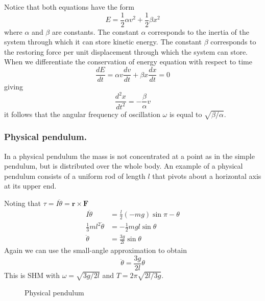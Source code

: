 \documentclass[../../../main.tex]{subfiles}
\begin{document}
Notice that both equations have the form
\begin{equation*}
    E=\frac{1}{2}\alpha v^2+\frac{1}{2}\beta x^2
\end{equation*}
where $\alpha$ and $\beta$ are constants. The constant $\alpha$ corresponds to the inertia of the system through which it can store kinetic energy. The constant $\beta$ corresponds to the restoring force per unit displacement through which the system can store. When we differentiate the conservation of energy equation with respect to time 
\begin{equation*}
    \frac{dE}{dt}=\alpha v\frac{dv}{dt}+\beta x\frac{dx}{dt}=0
\end{equation*}
giving
\begin{equation*}
    \frac{d^2x}{dt^2}=-\frac{\beta}{\alpha}v
\end{equation*}
it follows that the angular frequency of oscillation $\omega$ is equal to $\sqrt{\beta/\alpha}$.

\subsubsection{Physical pendulum.} In a physical pendulum the mass is not concentrated at a point as in the simple pendulum, but is distributed over the whole body. An example of a physical pendulum consists of a uniform rod of length $l$ that pivots about a horizontal axis at its upper end. 

Noting that $\tau=I\ddot{\theta}=\mathbf{r}\times\mathbf{F}$
\begin{align*}
    I\ddot{\theta}&=\frac{l}{2}(-mg)\sin \pi-\theta\\
    \frac{1}{3}ml^2\ddot{\theta}&=-\frac{1}{2}mgl\sin \theta\\
    \ddot{\theta}&=\frac{3g}{2l}\sin\theta
\end{align*}
Again we can use the small-angle approximation to obtain
\begin{equation*}
    \ddot{\theta}=\frac{3g}{2l}\theta
\end{equation*}
This is SHM with $\omega = \sqrt{3g/2l} $ and $T = 2\pi \sqrt{2l/3g}$.
\begin{figure}[h]
    \centering
    \caption*{Physical pendulum}
\end{figure}
\end{document}
